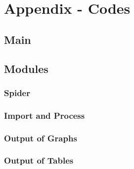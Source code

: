 \documentclass[cic,tc, english]{iiufrgs}
\begin{document}
    
\chapter{Appendix - Codes} \label{chapter_appendix}

\section{Main}

    

\section{Modules}

\subsection{Spider}

    

\subsection{Import and Process}

    

\subsection{Output of Graphs}

    

\subsection{Output of Tables}

    


 \label{chapter_bibliography}
\end{document}
